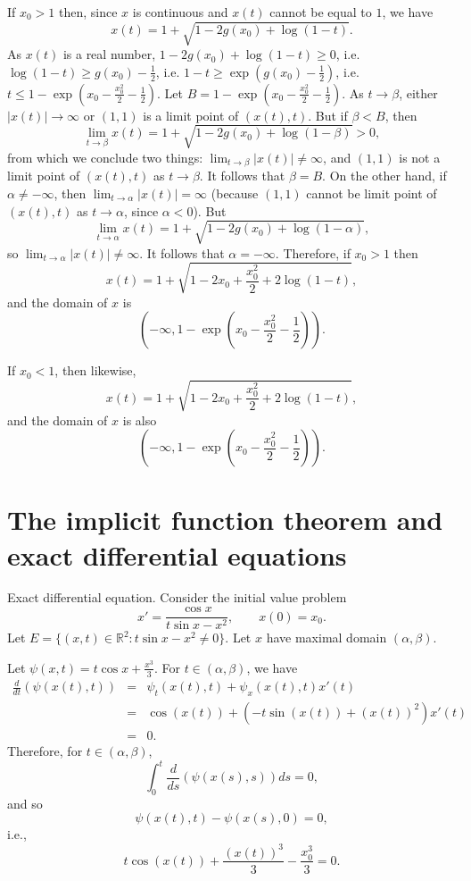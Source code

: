 \documentclass{article}
\theoremstyle{definition}
\begin{document}
If $x_0>1$ then, since $x$ is continuous and $x(t)$ cannot be equal to $1$, we have
\[
x(t)=1+\sqrt{1-2g(x_0)+\log(1-t)}.
\]
As $x(t)$ is a real number,  $1-2g(x_0)+\log(1-t) \geq 0$, i.e. $\log(1-t) \geq g(x_0)-\frac{1}{2}$, i.e.
$1-t \geq \exp(g(x_0)-\frac{1}{2})$, i.e. $t \leq 1-\exp\left(x_0 - \frac{x_0^2}{2}-\frac{1}{2}\right)$. Let $B=1-\exp\left(x_0 - \frac{x_0^2}{2}-\frac{1}{2}\right)$. 
As $t \to \beta$, either $|x(t)| \to \infty$ or $(1,1)$ is a limit point of $(x(t),t)$. But if $\beta < B$, then
\[
\lim_{t \to \beta} x(t)=1+\sqrt{1-2g(x_0)+\log(1-\beta)}>0,
\]
from which we conclude two things:
$\lim_{t \to \beta} |x(t)| \neq \infty$, and $(1,1)$ is not a limit point of $(x(t),t)$ as $t \to \beta$. It follows that $\beta=B$. On the other hand, 
if $\alpha \neq -\infty$, then $\lim_{t \to \alpha} |x(t)|=\infty$ (because $(1,1)$ cannot be limit point of $(x(t),t)$ as $t \to \alpha$, since $\alpha<0$). 
But 
\[
\lim_{t \to \alpha} x(t)=1+\sqrt{1-2g(x_0)+\log(1-\alpha)},
\]
so $\lim_{t \to \alpha} |x(t)| \neq \infty$. It follows that $\alpha=-\infty$. Therefore, if $x_0>1$ then
\[
x(t)=1+\sqrt{1-2x_0+\frac{x_0^2}{2}+2\log(1-t)},
\]
and the domain of $x$ is
\[
\left( -\infty, 1-\exp\left(x_0 - \frac{x_0^2}{2}-\frac{1}{2}\right) \right).
\]

If $x_0<1$, then likewise,
\[
x(t)=1+\sqrt{1-2x_0+\frac{x_0^2}{2}+2\log(1-t)},
\]
and the domain of $x$ is also
\[
\left( -\infty, 1-\exp\left(x_0 - \frac{x_0^2}{2}-\frac{1}{2}\right) \right).
\]

\section{The implicit function theorem and exact differential equations}
Exact differential equation. Consider the initial value problem
\[
x'=\frac{\cos x}{t\sin x-x^2}, \qquad x(0)=x_0.
\]
Let $E=\{(x,t) \in \mathbb{R}^2: t\sin x-x^2 \neq 0\}$.  Let $x$ have maximal domain $(\alpha,\beta)$.

Let $\psi(x,t)=t\cos x+\frac{x^3}{3}$. For $t \in (\alpha,\beta)$, we have
\begin{eqnarray*}
\frac{d}{dt} (\psi(x(t),t))&=&\psi_t(x(t),t)+\psi_x(x(t),t)x'(t)\\
&=&\cos(x(t))+(-t\sin(x(t))+(x(t))^2)x'(t)\\
&=&0.
\end{eqnarray*}
Therefore, for $t \in (\alpha,\beta)$,
\[
\int_0^t \frac{d}{ds} (\psi(x(s),s))  ds=0,
\]
and so
\[
\psi(x(t),t)-\psi(x(s),0)=0,
\]
i.e.,
\begin{equation}
t\cos(x(t))+\frac{(x(t))^3}{3}-\frac{x_0^3}{3}=0.
\label{curve}
\end{equation}
\end{document}
